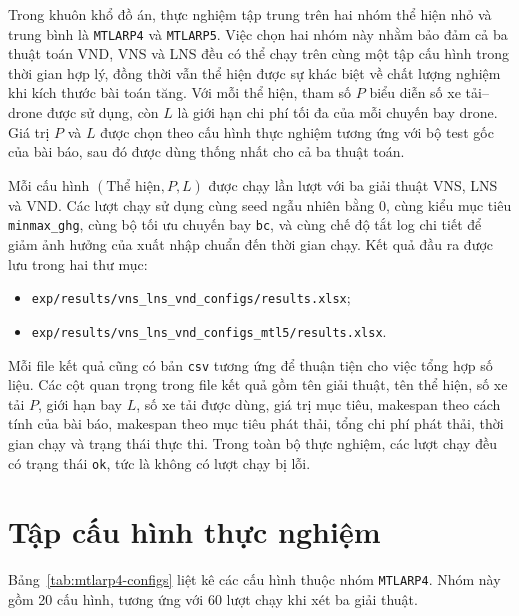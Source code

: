 Trong khuôn khổ đồ án, thực nghiệm tập trung trên hai nhóm thể hiện nhỏ và trung bình là \texttt{MTLARP4} và \texttt{MTLARP5}. Việc chọn hai nhóm này nhằm bảo đảm cả ba thuật toán VND, VNS và LNS đều có thể chạy trên cùng một tập cấu hình trong thời gian hợp lý, đồng thời vẫn thể hiện được sự khác biệt về chất lượng nghiệm khi kích thước bài toán tăng. Với mỗi thể hiện, tham số \(P\) biểu diễn số xe tải--drone được sử dụng, còn \(L\) là giới hạn chi phí tối đa của mỗi chuyến bay drone. Giá trị \(P\) và \(L\) được chọn theo cấu hình thực nghiệm tương ứng với bộ test gốc của bài báo, sau đó được dùng thống nhất cho cả ba thuật toán.

Mỗi cấu hình \((\text{Thể hiện},P,L)\) được chạy lần lượt với ba giải thuật VNS, LNS và VND. Các lượt chạy sử dụng cùng seed ngẫu nhiên bằng \(0\), cùng kiểu mục tiêu \texttt{minmax\_ghg}, cùng bộ tối ưu chuyến bay \texttt{bc}, và cùng chế độ tắt log chi tiết để giảm ảnh hưởng của xuất nhập chuẩn đến thời gian chạy. Kết quả đầu ra được lưu trong hai thư mục:
\begin{itemize}
    \item \texttt{exp/results/vns\_lns\_vnd\_configs/results.xlsx};
    \item \texttt{exp/results/vns\_lns\_vnd\_configs\_mtl5/results.xlsx}.
\end{itemize}

Mỗi file kết quả cũng có bản \texttt{csv} tương ứng để thuận tiện cho việc tổng hợp số liệu. Các cột quan trọng trong file kết quả gồm tên giải thuật, tên thể hiện, số xe tải \(P\), giới hạn bay \(L\), số xe tải được dùng, giá trị mục tiêu, makespan theo cách tính của bài báo, makespan theo mục tiêu phát thải, tổng chi phí phát thải, thời gian chạy và trạng thái thực thi. Trong toàn bộ thực nghiệm, các lượt chạy đều có trạng thái \texttt{ok}, tức là không có lượt chạy bị lỗi.

\section{Tập cấu hình thực nghiệm}
\label{sec:experiment-instances}

Bảng~\ref{tab:mtlarp4-configs} liệt kê các cấu hình thuộc nhóm \texttt{MTLARP4}. Nhóm này gồm 20 cấu hình, tương ứng với 60 lượt chạy khi xét ba giải thuật.

